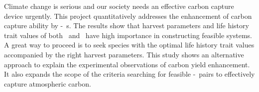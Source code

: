 \documentclass[../thesis.tex]{subfiles} %
\begin{document}
Climate change is serious and our society needs an effective carbon capture device urgently.  This project quantitatively addresses the enhancement of carbon capture ability by \phy-\bac\ \pbs s.  The results show that harvest parameters and life history trait values of both \phy\ and \bac\ have high importance in constructing feasible systems.  A great way to proceed is to seek species with the optimal life history trait values accompanied by the right harvest parameters.  This study shows an alternative approach to explain the experimental observations of carbon yield enhancement.  It also expands the scope of the criteria searching for feasible \phy-\bac\ pairs to effectively capture atmospheric carbon.
\end{document}
